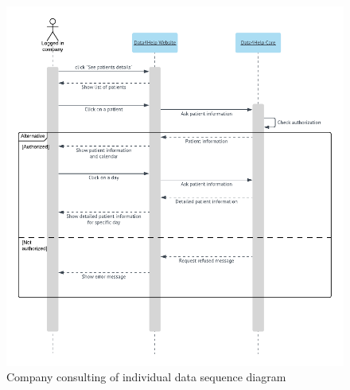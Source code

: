 \begin{figure}[H]
  \includegraphics[width=\textwidth,height=\textheight,keepaspectratio]{assets/sequence/CompanyConsultingOfIndividualData.pdf}
  \caption{Company consulting of individual data sequence diagram}
  \label{fig:CompanyConsultingOfIndividualData}
\end{figure}













\newpage
